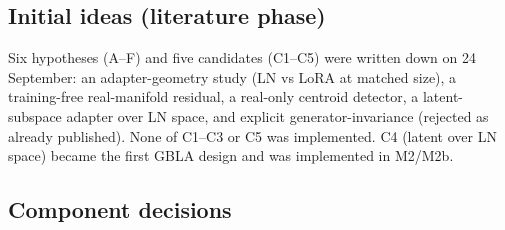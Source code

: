 \documentclass[10pt,a4paper]{article}
\begin{document}
\subsection{Initial ideas (literature phase)}
Six hypotheses (A--F) and five candidates (C1--C5) were written down on 24 September: an
adapter-geometry study (LN vs LoRA at matched size), a training-free real-manifold residual, a
real-only centroid detector, a latent-subspace adapter over LN space, and explicit
generator-invariance (rejected as already published). None of C1--C3 or C5 was implemented. C4
(latent over LN space) became the first GBLA design and was implemented in M2/M2b.

\subsection{Component decisions}
\end{document}
